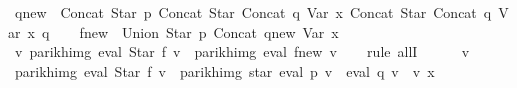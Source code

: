 \begin{isabellebody}
\ {\isacharquery}{\kern0pt}q{\isacharunderscore}{\kern0pt}new\ {\isacharequal}{\kern0pt}\ {\isachardoublequoteopen}Concat\ {\isacharparenleft}{\kern0pt}Star\ p{\isacharparenright}{\kern0pt}\ {\isacharparenleft}{\kern0pt}Concat\ {\isacharparenleft}{\kern0pt}Star\ {\isacharparenleft}{\kern0pt}Concat\ q\ {\isacharparenleft}{\kern0pt}Var\ x{\isacharparenright}{\kern0pt}{\isacharparenright}{\kern0pt}{\isacharparenright}{\kern0pt}\ {\isacharparenleft}{\kern0pt}Concat\ {\isacharparenleft}{\kern0pt}Star\ {\isacharparenleft}{\kern0pt}Concat\ q\ {\isacharparenleft}{\kern0pt}Var\ x{\isacharparenright}{\kern0pt}{\isacharparenright}{\kern0pt}{\isacharparenright}{\kern0pt}\ q{\isacharparenright}{\kern0pt}{\isacharparenright}{\kern0pt}{\isachardoublequoteclose}\isanewline
\ \ \isamarkupfalse%
\ {\isacharquery}{\kern0pt}f{\isacharunderscore}{\kern0pt}new\ {\isacharequal}{\kern0pt}\ {\isachardoublequoteopen}Union\ {\isacharparenleft}{\kern0pt}Star\ p{\isacharparenright}{\kern0pt}\ {\isacharparenleft}{\kern0pt}Concat\ {\isacharquery}{\kern0pt}q{\isacharunderscore}{\kern0pt}new\ {\isacharparenleft}{\kern0pt}Var\ x{\isacharparenright}{\kern0pt}{\isacharparenright}{\kern0pt}{\isachardoublequoteclose}\isanewline
\isanewline
\ \ \isamarkupfalse%
\ {\isachardoublequoteopen}{\isasymforall}v{\isachardot}{\kern0pt}\ {\isacharparenleft}{\kern0pt}parikh{\isacharunderscore}{\kern0pt}img\ {\isacharparenleft}{\kern0pt}eval\ {\isacharparenleft}{\kern0pt}Star\ f{\isacharparenright}{\kern0pt}\ v{\isacharparenright}{\kern0pt}\ {\isacharequal}{\kern0pt}\ parikh{\isacharunderscore}{\kern0pt}img\ {\isacharparenleft}{\kern0pt}eval\ {\isacharquery}{\kern0pt}f{\isacharunderscore}{\kern0pt}new\ v{\isacharparenright}{\kern0pt}{\isacharparenright}{\kern0pt}{\isachardoublequoteclose}\isanewline
\ \ \isamarkupfalse%
\ {\isacharparenleft}{\kern0pt}rule\ allI{\isacharparenright}{\kern0pt}\isanewline
\ \ \ \ \isamarkupfalse%
\ v\isanewline
\ \ \ \ \isamarkupfalse%
\ {\isachardoublequoteopen}parikh{\isacharunderscore}{\kern0pt}img\ {\isacharparenleft}{\kern0pt}eval\ {\isacharparenleft}{\kern0pt}Star\ f{\isacharparenright}{\kern0pt}\ v{\isacharparenright}{\kern0pt}\ {\isacharequal}{\kern0pt}\ parikh{\isacharunderscore}{\kern0pt}img\ {\isacharparenleft}{\kern0pt}star\ {\isacharparenleft}{\kern0pt}eval\ p\ v\ {\isasymunion}\ eval\ q\ v\ {\isacharat}{\kern0pt}{\isacharat}{\kern0pt}\ v\ x{\isacharparenright}{\kern0pt}{\isacharparenright}{\kern0pt}{\isachardoublequoteclose}\isanewline
\ \ \ \ \ \ \isamarkupfalse%

\end{isabellebody}
